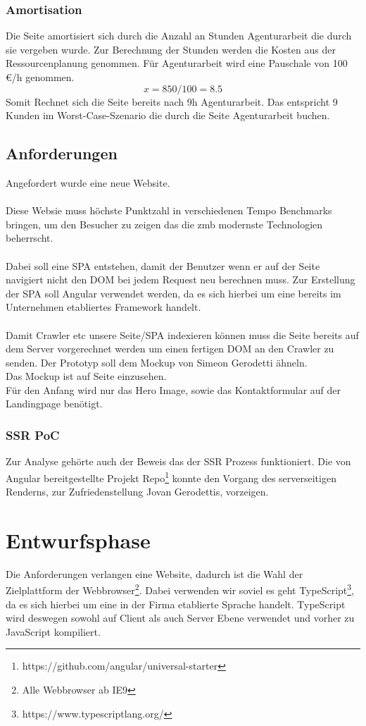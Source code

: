 \documentclass[11pt,a4paper]{article}
\begin{document}
\subsubsection{Amortisation}
Die Seite amortisiert sich durch die Anzahl an Stunden Agenturarbeit die durch sie vergeben wurde.
Zur Berechnung der Stunden werden die Kosten aus der Ressourcenplanung genommen. Für Agenturarbeit wird eine  Pauschale von 100 €/h genommen.\\
\begin{equation*}
x = 850 / 100 = 8.5
\end{equation*}
Somit Rechnet sich die Seite bereits nach 9h Agenturarbeit. Das entspricht 9 Kunden im Worst-Case-Szenario die durch die Seite Agenturarbeit buchen.
\subsection{Anforderungen}
Angefordert wurde eine neue Website.\\\\
Diese Websie muss höchste Punktzahl in verschiedenen Tempo Benchmarks bringen, um den Besucher zu zeigen das die zmb modernste Technologien beherrscht.\\\\
Dabei soll eine \acs{SPA} entstehen, damit der Benutzer wenn er auf der Seite navigiert nicht den \acs{DOM} bei jedem Request neu berechnen muss.
Zur Erstellung der SPA soll Angular verwendet werden, da es sich hierbei um eine bereits im Unternehmen etabliertes Framework handelt.\\\\
Damit Crawler etc unsere Seite/SPA indexieren können muss die Seite bereits auf dem Server vorgerechnet werden um einen fertigen \acs{DOM} an den Crawler zu senden.
Der Prototyp soll dem Mockup von Simeon Gerodetti ähneln.\\ Das Mockup ist auf Seite \pageref{sec:mock} einzusehen.\\Für den Anfang wird nur das Hero Image, sowie das Kontaktformular auf der Landingpage benötigt.
\subsubsection{SSR PoC}
Zur Analyse gehörte auch der Beweis das der SSR Prozess funktioniert. Die von Angular bereitgestellte Projekt Repo\footnote{https://github.com/angular/universal-starter} konnte den Vorgang des serverseitigen Renderns, zur Zufriedenstellung Jovan Gerodettis, vorzeigen.
\section{Entwurfsphase}
Die Anforderungen verlangen eine Website, dadurch ist die Wahl der Zielplattform der Webbrowser\footnote{Alle Webbrowser ab IE9}. Dabei verwenden wir soviel es geht TypeScript\footnote{https://www.typescriptlang.org/}, da es sich hierbei um eine in der Firma etablierte Sprache handelt. TypeScript wird deswegen sowohl auf Client als auch Server Ebene verwendet und vorher zu JavaScript kompiliert.
\end{document}
